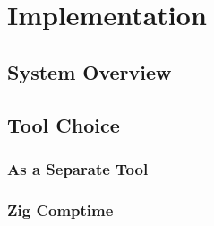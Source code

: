 \chapter{Implementation}

\section{System Overview}


\section{Tool Choice}


\subsection{As a Separate Tool}



\subsection{Zig Comptime}


